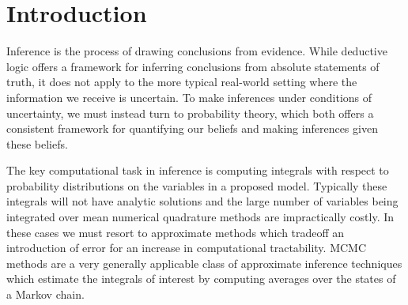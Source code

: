 \chapter{Introduction}\label{ch:probabilistic-modelling}

Inference is the process of drawing conclusions from evidence. 
While deductive logic offers a framework for inferring conclusions from absolute statements of truth, it does not apply to the more typical real-world setting where the information we receive is uncertain. 
To make inferences under conditions of uncertainty, we must instead turn to probability theory, which both offers a consistent framework for quantifying our beliefs and making inferences given these beliefs. %


The key computational task in inference is computing integrals with respect to probability distributions on the variables in a proposed model. Typically these integrals will not have analytic solutions and the large number of variables being integrated over mean numerical quadrature methods are impractically costly. In these cases we must resort to approximate methods which tradeoff an introduction of error for an increase in computational tractability. \ac{MCMC} methods are a very generally applicable class of approximate inference techniques which estimate the integrals of interest by computing averages over the states of a Markov chain. 

